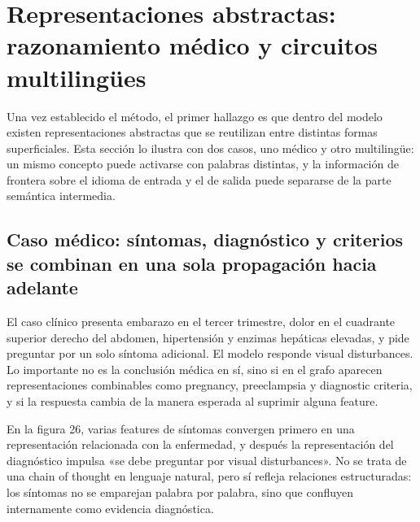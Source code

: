 \section{Representaciones abstractas: razonamiento médico y circuitos multilingües}

Una vez establecido el método, el primer hallazgo es que dentro del modelo existen representaciones abstractas que se reutilizan entre distintas formas superficiales. Esta sección lo ilustra con dos casos, uno médico y otro multilingüe: un mismo concepto puede activarse con palabras distintas, y la información de frontera sobre el idioma de entrada y el de salida puede separarse de la parte semántica intermedia.

\subsection{Caso médico: síntomas, diagnóstico y criterios se combinan en una sola propagación hacia adelante}

El caso clínico presenta embarazo en el tercer trimestre, dolor en el cuadrante superior derecho del abdomen, hipertensión y enzimas hepáticas elevadas, y pide preguntar por un solo síntoma adicional. El modelo responde visual disturbances. Lo importante no es la conclusión médica en sí, sino si en el grafo aparecen representaciones combinables como pregnancy, preeclampsia y diagnostic criteria, y si la respuesta cambia de la manera esperada al suprimir alguna feature.



En la figura 26, varias features de síntomas convergen primero en una representación relacionada con la enfermedad, y después la representación del diagnóstico impulsa «se debe preguntar por visual disturbances». No se trata de una chain of thought en lenguaje natural, pero sí refleja relaciones estructuradas: los síntomas no se emparejan palabra por palabra, sino que confluyen internamente como evidencia diagnóstica.


